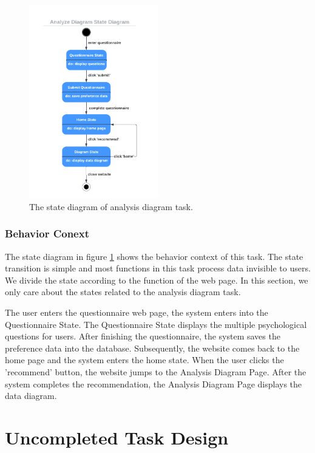 \documentclass[conference]{IEEEtran}
\begin{document}
\begin{figure}[htbp]
\centerline{\includegraphics[width=0.5\textwidth]{diagram_state_diagram.pdf}}
\caption{The state diagram of analysis diagram task.}
\label{diagram_state_diagram}
\end{figure}


\subsubsection{\textbf{Behavior Conext }}

\textbf{}

The state diagram in figure \ref{diagram_state_diagram} shows the behavior context of this task. The state transition is simple and most functions in this task process data invisible to users. We divide the state according to the function of the web page. In this section, we only care about the states related to the analysis diagram task.

The user enters the questionnaire web page, the system enters into the Questionnaire State. The Questionnaire State displays the multiple psychological questions for users. After finishing the questionnaire, the system saves the preference data into the database. Subsequently, the website comes back to the home page and the system enters the home state. When the user clicks the 'recommend' button, the website jumps to the Analysis Diagram Page. After the system completes the recommendation, the Analysis Diagram Page displays the data diagram. 



\section{\textbf{Uncompleted Task Design }}
\end{document}
